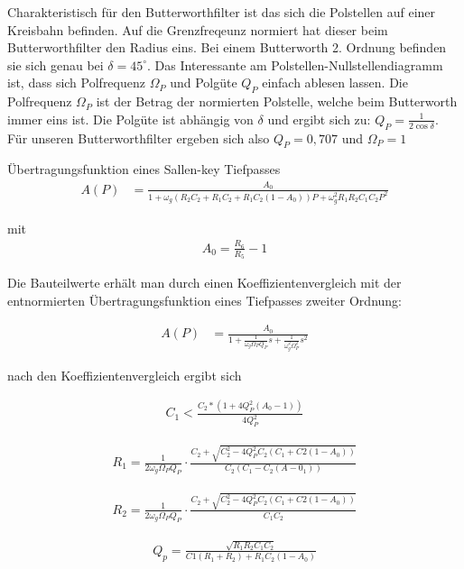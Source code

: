 Charakteristisch für den Butterworthfilter ist das sich die Polstellen auf einer Kreisbahn befinden. Auf die Grenzfreqeunz normiert hat dieser beim Butterworthfilter den Radius
eins. Bei einem Butterworth 2. Ordnung befinden sie sich genau bei $\delta=45^\circ$. Das Interessante am Polstellen-Nullstellendiagramm ist, dass sich Polfrequenz $\Omega_P$ und 
Polgüte $Q_P$ einfach ablesen lassen. Die Polfrequenz $\Omega_P$ ist der Betrag der normierten Polstelle, welche beim Butterworth immer eins ist.
Die Polgüte ist abhängig von $\delta$ und ergibt sich zu: $Q_P=\frac{1}{2\cos{\delta}}$. Für unseren Butterworthfilter ergeben sich also $Q_P=0,707$ und $\Omega_P=1$


Übertragungsfunktion eines Sallen-key Tiefpasses
\begin{align*}
A(P)&=\frac{A_0}{1+\omega_g (R_2 C_2 + R_1 C_2 + R_1 C_2(1-A_0))P + \omega_g^2R_1 R_2 C_1C_2P^2}
\end{align*}

mit
\begin{align*}
A_0=\frac{R_6}{R_5}-1
\end{align*}


Die Bauteilwerte erhält man durch einen Koeffizientenvergleich mit der entnormierten
Übertragungsfunktion eines Tiefpasses zweiter Ordnung:

\begin{align*}
A(P)&=\frac{A_0}{1+\frac{1}{\omega_g\Omega_PQ_P}s+\frac{1}{\omega_g^2\Omega_P^2}s^2}
\end{align*}

nach den Koeffizientenvergleich ergibt sich

\begin{align*}
C_1<\frac{C_2*(1+4Q^2_P(A_0-1))}{4Q^2_P}
\end{align*}

\begin{align*}
R_1=\frac{1}{2\omega_g\Omega_PQ_P} \cdot \frac{C_2+\sqrt{C_2^2-4Q^2_PC_2(C_1+C2(1-A_0))}}{C_2(C_1-C_2(A-0_1))}           
\end{align*}


\begin{align*}
R_2=\frac{1}{2\omega_g\Omega_PQ_P} \cdot \frac{C_2+\sqrt{C_2^2-4Q^2_PC_2(C_1+C2(1-A_0))}}{C_1C_2}           
\end{align*}


\begin{align*}
Q_p=\frac{\sqrt{R_1R_2C_1C_2}}{C1(R_1+R_2)+R_1C_2(1-A_0)}
\end{align*}


